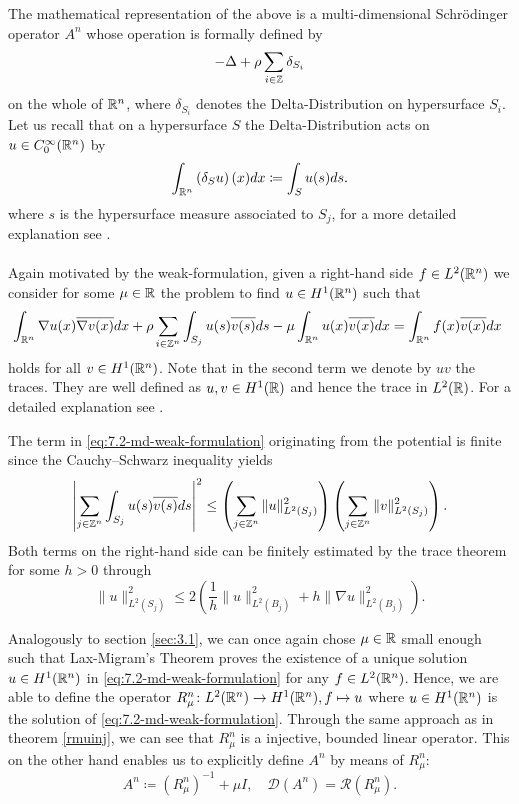 The mathematical representation of the above is a multi-dimensional Schrödinger operator $A^{n}$ whose operation is formally defined by
\begin{equation}
	- \Delta + \rho \sum_{i \in \mathbb{Z}} \delta_{S_{i}} \label{eq:7.1-md_the_operator_A_formallyy}
\end{equation}
on the whole of $\mathbb{R}^{n}$, where $\delta_{S_{i}}$ denotes the Delta-Distribution on hypersurface $S_{i}$. Let us recall that on a hypersurface $S$ the Delta-Distribution acts on $u \in C_{0}^{\infty}(\mathbb{R}^{n})$ by 
	\[ \int_{\mathbb{R}^{n}} \left( \delta_{S} u \right) (x) dx \coloneqq \int_{S} u(s) ds . \]
where $s$ is the hypersurface measure associated to $S_{j}$, for a more detailed explanation see \cite{federer1978geomeasure}.
~\\ ~\\ %
Again motivated by the weak-formulation, given a right-hand side $f \in L^{2}(\mathbb{R}^{n})$ we consider for some $\mu \in \mathbb{R}$ the problem to find $u \in H^{1}(\mathbb{R}^{n})$ such that
	\begin{equation}
		\int_{\R^{n}} \nabla u(x) \overline{\nabla v(x)} dx + \rho \sum_{i \in \Z^{n}} \int_{S_{j}} u(s) \overline{v(s)} ds - \mu \int_{\R^{n}} u(x) \overline{v(x)} dx = \int_{\R^{n}} f(x) \overline{v(x)} dx \label{eq:7.2-md-weak-formulation}
	\end{equation} 
holds for all $v \in H^{1}(\mathbb{R}^{n})$. Note that in the second term we denote by $u v$ the traces. They are well defined as $u, v \in H^{1}(\mathbb{R})$ and hence the trace in $L^{2}(\mathbb{R})$. For a detailed explanation see \cite[page 164]{adams2003sobolev}.  

\begin{remark}
	The term in \eqref{eq:7.2-md-weak-formulation} originating from the potential is finite since the Cauchy–Schwarz inequality yields
	\[ \left| \sum_{j \in \mathbb{Z}^{n}} \int_{S_{j}} u(s) \overline{v(s)} ds \right|^{2} \leq \left( \sum_{j \in \mathbb{Z}^{n}} \| u \|_{L^{2}(S_{j})}^{2} \right) \left( \sum_{j \in \mathbb{Z}^{n}} \| v \|_{L^{2}(S_{j})}^{2} \right). \] 
	Both terms on the right-hand side can be finitely estimated by the trace theorem \cite[page 258]{evans1998partial} for some $h > 0$ through
	\[ \| u \|_{L^{2}(S_{j})}^{2} \leq 2 \left( \frac{1}{h} \|u\|_{L^{2}(B_{j})}^{2} + h \| \nabla u \|_{L^{2}(B_{j})}^{2} \right). \]
\end{remark}

Analogously to section \ref{sec:3.1}, we can once again chose $\mu \in \mathbb{R}$ small enough such that Lax-Migram's Theorem proves the existence of a unique solution $u \in H^{1}(\mathbb{R}^{n})$ in \eqref{eq:7.2-md-weak-formulation} for any $f \in L^{2}(\mathbb{R}^{n})$. Hence, we are able to define the operator $R_{\mu}^{n} \colon L^{2}(\mathbb{R}^{n}) \rightarrow H^{1}(\mathbb{R}^{n}), f \mapsto u$ where $u \in H^{1}(\mathbb{R}^{n})$ is the solution of \eqref{eq:7.2-md-weak-formulation}. Through the same approach as in theorem \ref{rmuinj}, we can see that $R_{\mu}^{n}$ is a injective, bounded linear operator. This on the other hand enables us to explicitly define $A^{n}$ by means of $R_{\mu}^{n}$:
\[ A^{n} \coloneqq \left(R_{\mu}^{n}\right)^{-1} + \mu I, \quad \mathcal{D}(A^{n}) = \mathcal{R}(R_{\mu}^{n}). \]

